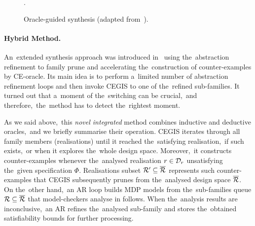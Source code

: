 \begin{figure}[ht!]
    \centering
  \vspace{-0,5em}
    \caption{Oracle-guided synthesis (adapted from~\cite{tacas21}).}
    \label{fig:adaptivesynt}.
    \vspace{-1em}
\end{figure}

\paragraph{Hybrid Method.}
An~extended synthesis approach was introduced in~\cite{roman-DP,tacas21} using the~abstraction refinement to family prune and accelerating the~construction of counter-examples by CE-oracle.
Its main idea is to perform a~limited number of abstraction refinement loops and then invoke CEGIS to one of the~refined sub-families.
It turned out that a~moment of the~switching can be crucial,~and therefore,~the~method has to detect the~rightest moment.

As we said above,~this \textit{novel integrated} method combines inductive and deductive oracles,~and we briefly summarise their operation.
CEGIS iterates through all family members (realisations) until it reached the~satisfying realisation,~if such exists,~or when it explores the~whole design space.
Moreover,~it constructs counter-examples whenever the~analysed realisation $r \in \mathcal{D}_r$ unsatisfying the~given specification $\Phi$.
Realisations subset $\mathcal{R}' \subseteq \overline{\mathcal{R}}$ represents such counter-examples that CEGIS subsequently prunes from the~analysed design space $\overline{\mathcal{R}}$.
On the~other hand,~an AR loop builds MDP models from the~sub-families queue $\mathcal{R} \subseteq \overline{\mathcal{R}}$ that model-checkers analyse in follows.
When the~analysis results are inconclusive,~an AR refines the~analysed sub-family and  stores the~obtained satisfiability bounds for further processing.

